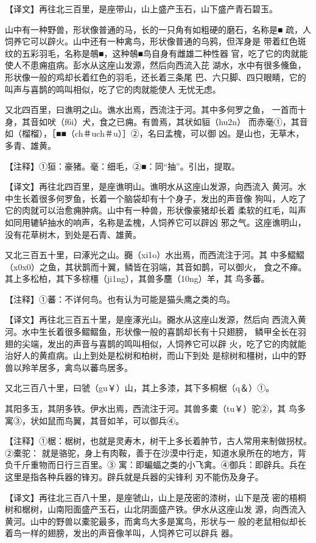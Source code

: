 \documentclass[a4paper,12pt,UTF8,twoside]{ctexbook}
\begin{document}
【译文】再往北三百里，是座带山，山上盛产玉石，山下盛产青石碧玉。

山中有一种野兽，形状像普通的马，长的一只角有如粗硬的磨石，名称是■ 疏，人饲养它可以辟火。山中还有一种禽鸟，形状像普通的乌鸦，但浑身是 带着红色斑纹的五彩羽毛，名称是鵸■，这种鵸■鸟自身有雌雄二种性器 官，吃了它的肉就能使人不患痈疽病。彭水从这座山发源，然后向西流入芘 湖水，水中有很多儵鱼，形状像一般的鸡却长着红色的羽毛，还长着三条尾 巴、六只脚、四只眼睛，它的叫声与喜鹊的鸣叫相似，吃了它的肉就能使人 无忧无虑。

又北四百里，曰谯明之山。谯水出焉，西流注于河。其中多何罗之鱼， 一首而十身，其音如吠（f6i）犬，食之已痈。有兽焉，其状如貆（hu2n） 而赤毫①，其音如（榴榴），［■■（ch＃uch＃u）］②，名曰孟槐，可以御 凶。是山也，无草木，多青、雄黄。

【注释】①狟：豪猪。毫：细毛，②■：同“抽”。引出，提取。

【译文】再往北四百里，是座谯明山。谯明水从这座山发源，向西流入 黄河。水中生长着很多何罗鱼，长着一个脑袋却有十个身子，发出的声音像 狗叫，人吃了它的肉就可以治愈痈肿病。山中有一种兽，形状像豪猪却长着 柔软的红毛，叫声如同用辘轳抽水的响声，名称是孟槐，人饲养它可以辟凶 邪之气。这座谯明山，没有花草树木，到处是石青、雄黄。

又北三百五十里，曰涿光之山。嚻（xi1o）水出焉，而西流注于河。其 中多鰼鰼（x0x0）之鱼，其状鹊而十翼，鳞皆在羽端，其音如鹊，可以御火， 食之不瘅。其上多松柏，其下多棕橿（ji1ng），其兽多麢（10ng）羊，其 鸟多蕃。

【注释】①蕃：不详何鸟。也有认为可能是猫头鹰之类的鸟。

【译文】再往北三百五十里，是座涿光山。嚻水从这座山发源，然后向 西流入黄河。水中生长着很多鳛鳛鱼，形状像一般的喜鹊却长有十只翅膀， 鳞甲全长在羽翅的尖端，发出的声音与喜鹊的鸣叫相似，人饲养它可以辟 火，吃了它的肉就能治好人的黄疸病。山上到处是松树和柏树，而山下到处 是棕树和橿树，山中的野兽以羚羊居多，禽鸟以蕃鸟居多。

又北三百八十里，曰虢（gu￥）山，其上多漆，其下多桐椐（q＆）①。

其阳多玉，其阴多铁。伊水出焉，西流注于河。其兽多橐（tu￥）驼②，其 鸟多寓③，状如鼠而鸟翼，其音如羊，可以御兵④。

【注释】①椐：椐树，也就是灵寿木，树干上多长着肿节，古人常用来制做拐杖。②橐驼： 就是骆驼，身上有肉鞍，善于在沙漠中行走，知道水泉所在的地方，背负千斤重物而日行三百里。③ 寓：即蝙蝠之类的小飞禽。④御兵：即辟兵。兵在这里是指各种兵器的锋刃。辟兵就是兵器的尖锋利 刃不能伤及身子。

【译文】再往北三百八十里，是座虢山，山上是茂密的漆树，山下是茂 密的梧桐树和椐树，山南阳面盛产玉石，山北阴面盛产铁。伊水从这座山发 源，向西流入黄河。山中的野兽以橐驼最多，而禽鸟大多是寓鸟，形状与一 般的老鼠相似却长着鸟一样的翅膀，发出的声音像羊叫，人饲养它可以辟兵 器。
\end{document}
